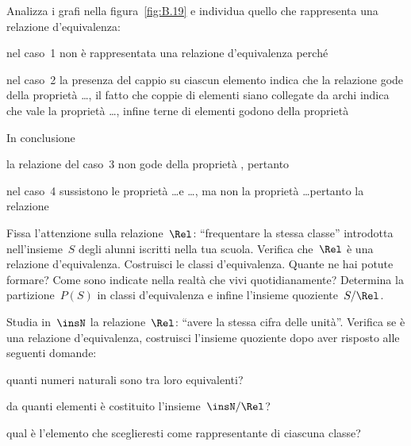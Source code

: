 \begin{multicols}{2}
\begin{esercizio}
\label{ese:B.31}
Analizza i grafi nella figura~\ref{fig:B.19} e individua quello che rappresenta una relazione d'equivalenza:
\begin{itemize*}
\item nel caso~1 non è rappresentata una relazione d'equivalenza perché \dotfill
\item nel caso~2 la presenza del cappio su ciascun elemento indica che la relazione gode della proprietà \ldots,
il fatto che coppie di elementi siano collegate da archi indica che vale la proprietà \ldots, infine terne di elementi godono della proprietà \dotfill

In conclusione\dotfill
\item la relazione del caso~3 non gode della proprietà \dotfill, pertanto \dotfill
\item nel caso~4 sussistono le proprietà \ldots e \ldots, ma non la proprietà \ldots pertanto la relazione \dotfill
\end{itemize*}
\end{esercizio}

\begin{esercizio}
\label{ese:B.32}
Fissa l'attenzione sulla relazione~$\Rel$: ``frequentare la stessa classe'' introdotta nell'insieme~$S$ degli alunni iscritti nella tua scuola.
Verifica che~$\Rel$ è una relazione d'equivalenza. Costruisci le classi d'equivalenza. Quante ne hai potute formare? Come sono indicate nella
realtà che vivi quotidianamente? Determina la partizione~$P(S)$ in classi d'equivalenza e infine l'insieme quoziente~$S/\Rel$.
\end{esercizio}

\begin{esercizio}
\label{ese:B.33}
Studia in~$\insN$ la relazione~$\Rel$: ``avere la stessa cifra delle unità''. Verifica se è una relazione
d'equivalenza, costruisci l'insieme quoziente dopo aver risposto alle seguenti domande:\vspace{-1ex}
\begin{itemize*}
\item quanti numeri naturali sono tra loro equivalenti?
\item da quanti elementi è costituito l'insieme~$\insN/\Rel$?
\item qual è l'elemento che sceglieresti come rappresentante di ciascuna classe?
\end{itemize*}
\end{esercizio}


\end{multicols}
